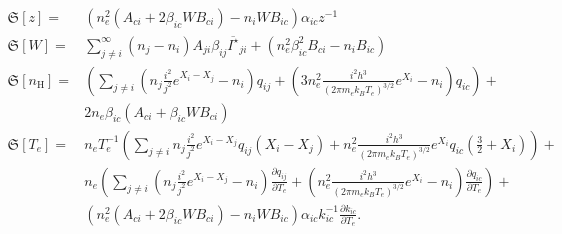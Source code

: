 \documentclass{article}
\begin{document}
\begin{equation}
    \begin{aligned}
        \mathfrak{S}[z] = &(n_e^2(A_{ci} + 2\beta_{ic}WB_{ci}) - n_iWB_{ic})\alpha_{ic}z^{-1}\\
        \mathfrak{S}[W] = &\sum\limits_{j\neq i}^\infty (n_j-n_i)A_{ji}\beta_{ij}\overline{I^\star}_{ji} + (n_e^2\beta_{ic}^2B_{ci} - n_iB_{ic})\\
        \mathfrak{S}[n_\mathrm{H}] = & \left(\sum\limits_{j \neq i}\left(n_j\frac{i^2}{j^2}e^{X_i-X_j}-n_i\right)q_{ij}  + \left(3n_e^2\frac{i^2h^3}{(2\pi m_ek_BT_e)^{3/2}}e^{X_i}-n_i\right)q_{ic}\right) + \\
        &2n_e\beta_{ic}(A_{ci} + \beta_{ic}WB_{ci})\\
        \mathfrak{S}[T_e] = & n_eT_e^{-1}\left(\sum\limits_{j \neq i}n_j\frac{i^2}{j^2}e^{X_i-X_j}q_{ij}(X_i - X_j) + n_e^2\frac{i^2h^3}{(2\pi m_ek_BT_e)^{3/2}}e^{X_i}q_{ic}\left(\frac{3}{2} + X_i\right)\right)+\\
        & n_e\left(\sum\limits_{j \neq i}\left(n_j\frac{i^2}{j^2}e^{X_i-X_j}-n_i\right)\frac{\partial q_{ij}}{\partial T_e}  + \left(n_e^2\frac{i^2h^3}{(2\pi m_ek_BT_e)^{3/2}}e^{X_i}-n_i\right)\frac{\partial q_{ic}}{\partial T_e}\right) + \\
        & (n_e^2(A_{ci} + 2\beta_{ic}WB_{ci}) - n_iWB_{ic})\alpha_{ic}k_{ic}^{-1}\frac{\partial k_{ic}}{\partial T_e}.
    \end{aligned}
\end{equation}
\end{document}
